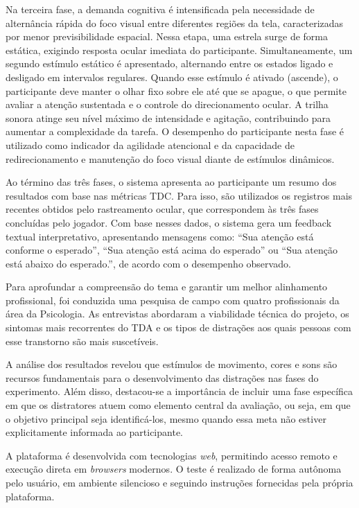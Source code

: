 Na terceira fase, a demanda cognitiva é intensificada pela necessidade de alternância rápida do foco visual entre diferentes regiões da tela, caracterizadas por menor previsibilidade espacial. Nessa etapa, uma estrela surge de forma estática, exigindo resposta ocular imediata do participante. Simultaneamente, um segundo estímulo estático é apresentado, alternando entre os estados ligado e desligado em intervalos regulares. Quando esse estímulo é ativado (ascende), o participante deve manter o olhar fixo sobre ele até que se apague, o que permite avaliar a atenção sustentada e o controle do direcionamento ocular. A trilha sonora atinge seu nível máximo de intensidade e agitação, contribuindo para aumentar a complexidade da tarefa. O desempenho do participante nesta fase é utilizado como indicador da agilidade atencional e da capacidade de redirecionamento e manutenção do foco visual diante de estímulos dinâmicos.

Ao término das três fases, o sistema apresenta ao participante um resumo dos resultados com base nas métricas TDC. Para isso, são utilizados os registros mais recentes obtidos pelo rastreamento ocular, que correspondem às três fases concluídas pelo jogador. Com base nesses dados, o sistema gera um feedback textual interpretativo, apresentando mensagens como: “Sua atenção está conforme o esperado”, “Sua atenção está acima do esperado” ou “Sua atenção está abaixo do esperado.”, de acordo com o desempenho observado.

Para aprofundar a compreensão do tema e garantir um melhor alinhamento profissional, foi conduzida uma pesquisa de campo com quatro profissionais da área da Psicologia. As entrevistas abordaram a viabilidade técnica do projeto, os sintomas mais recorrentes do TDA e os tipos de distrações aos quais pessoas com esse transtorno são mais suscetíveis.

A análise dos resultados revelou que estímulos de movimento, cores e sons são recursos fundamentais para o desenvolvimento das distrações nas fases do experimento. Além disso, destacou-se a importância de incluir uma fase específica em que os distratores atuem como elemento central da avaliação, ou seja, em que o objetivo principal seja identificá-los, mesmo quando essa meta não estiver explicitamente informada ao participante.

A plataforma é desenvolvida com tecnologias \textit{web}, permitindo acesso remoto e execução
direta em \textit{browsers} modernos. O teste é realizado de forma autônoma pelo usuário, em ambiente silencioso e seguindo instruções fornecidas pela própria plataforma.

